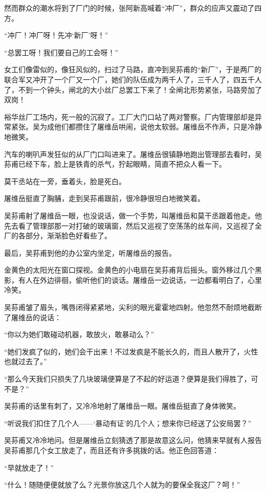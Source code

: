 \par 然而群众的潮水将到了厂门的时候，张阿新高喊着“冲厂”，群众的应声又震动了四方。
\par “冲厂！冲厂呀！先冲‘新厂’呀！”
\par “总罢工呀！我们要自己的工会呀！”
\par 女工们像雷似的，像狂风似的，扫过了马路，直冲到吴荪甫的“新厂”，于是两厂的联合军又冲开了一个厂又一个厂，她们的队伍成为两千人了，三千人了，四五千人了，不到一个钟头，闸北的大小丝厂总罢工下来了！全闸北形势紧张，马路旁加了双岗！
\par 裕华丝厂工场内，死一般的沉寂了。工厂大门口站了两对警察。厂内管理部却是异常紧张。吴为成他们都攒住了屠维岳哄闹，说他太软弱。屠维岳不作声，只是冷静地微笑。
\par 汽车的喇叭声发狂似的从厂门口叫进来了。屠维岳很镇静地跑出管理部去看时，吴荪甫已经下车，脸上是铁青的杀气，狞起眼睛，简直不把众人看一下。
\par 莫干丞站在一旁，垂着头，脸是死白。
\par 屠维岳挺直了胸脯，走到吴荪甫跟前，很冷静很坦白地微笑着。
\par 吴荪甫射了屠维岳一眼，也没说话，做一个手势，叫屠维岳和莫干丞跟着他走。他先去看了管理部那一对打破的玻璃窗，然后又巡视了空荡荡的丝车间，又巡视了全厂的各部分，渐渐脸色好看些了。
\par 最后，吴荪甫到他的办公室内坐定，听屠维岳的报告。
\par 金黄色的太阳光在窗口探视。金黄色的小电扇在吴荪甫背后摇头。窗外移过几个黑影，有人在外边徘徊，偷听他们的谈话。屠维岳一边说话，一边都看明白了，心里冷笑。
\par 吴荪甫皱了眉头，嘴唇闭得紧紧地，尖利的眼光霍霍地四射。他忽然不耐烦地截断了屠维岳的说话：
\par “你以为她们敢碰动机器，敢放火，敢暴动么？”
\par “她们发疯了似的，她们会干出来！不过发疯是不能长久的，而且人散开了，火性也就过去了。”
\par “那么今天我们只损失了几块玻璃便算是了不起的好运道？便算是我们得胜了，可不是？”
\par 吴荪甫的话里有刺了，又冷冷地射了屠维岳一眼。屠维岳挺直了身体微笑。
\par “听说我们扣住了几个人——‘暴动有证’的几个人；想来你已经送了公安局罢？”
\par 吴荪甫又冷冷地问。但是屠维岳立刻猜透了那是故意这么问，他猜来早就有人报告吴荪甫那几个女工放走了，而且还有许多挑拨的话。他正色回答道：
\par “早就放走了！”
\par “什么！随随便便就放了么？光景你放这几个人就为的要保全我这厂？呵！”
